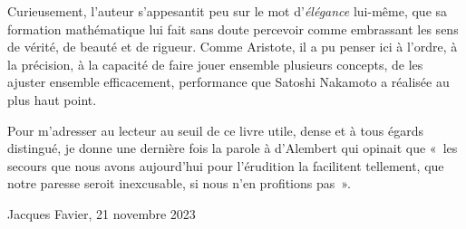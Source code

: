 Curieusement, l'auteur s'appesantit peu sur le mot d'\emph{élégance} lui-même, que sa formation mathématique lui fait sans doute percevoir comme embrassant les sens de vérité, de beauté et de rigueur. Comme Aristote, il a pu penser ici à l'ordre, à la précision, à la capacité de faire jouer ensemble plusieurs concepts, de les ajuster ensemble efficacement, performance que Satoshi Nakamoto a réalisée au plus haut point.

Pour m’adresser au lecteur au seuil de ce livre utile, dense et à tous égards distingué, je donne une dernière fois la parole à d'Alembert qui opinait que «~les secours que nous avons aujourd'hui pour l'érudition la facilitent tellement, que notre paresse seroit inexcusable, si nous n'en profitions pas~».

\begin{flushright}Jacques Favier, 21 novembre 2023\end{flushright}


